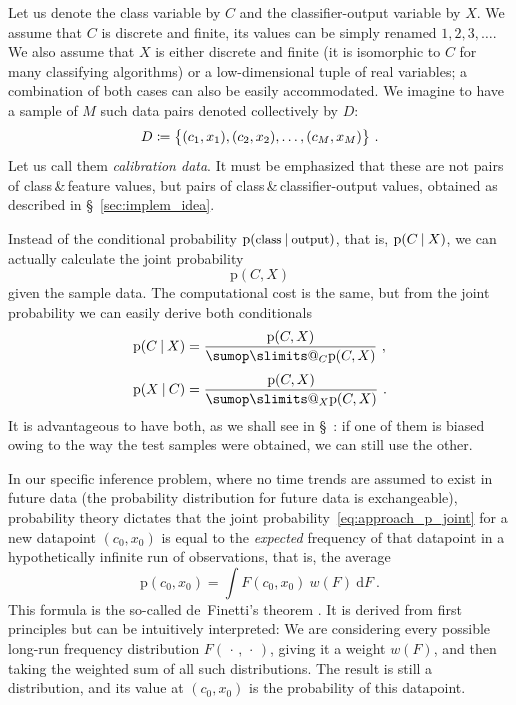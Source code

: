 \documentclass[\ifafour a4paper,12pt,\else a5paper,10pt,\fi%
onecolumn,oneside,article,%
british%
]{memoir}
\makeatletter
\theoremstyle{remark}
\theoremstyle{innote}
\def\sum{\DOTSI\sumop\slimits@}
\newcommand*{\amp}{\&}
\newcommand*{\wrench}{{\fontencoding{U}\fontfamily{fontawesomethree}\selectfont\symbol{114}}}
\newcommand*{\pencil}{{\fontencoding{U}\fontfamily{fontawesometwo}\selectfont\symbol{210}}}
\newcommand{\mynotew}[1]{{\footnotesize\color{notecolour}\wrench\ #1}}
\newcommand*{\di}{\mathrm{d}}%
\newcommand*{\defd}{\coloneqq}
\newcommand*{\dotv}{\mathord{\,\cdot\,}}%
\DeclarePairedDelimiter\set{\{}{\}} %
\newcommand*{\p}{\mathrm{p}}%
\renewcommand*{\|}[1][]{\nonscript\:#1\vert\nonscript\:\mathopen{}}
\newcommand*{\sect}{\S}%
\newcommand*{\chap}{ch.}%
\newcommand*{\wf}{w}
\newcommand*{\texts}[1]{\text{\small #1}}
\makeatother
\begin{document}
Let us denote the class variable by $C$ and the classifier-output variable by $X$. We assume that $C$ is discrete and finite, its values can be simply renamed $1,2,3,\dotsc$. We also assume that $X$ is either discrete and finite (it is isomorphic to $C$ for many classifying algorithms) or a low-dimensional tuple of real variables; a combination of both cases can also be easily accommodated. We imagine to have a sample of $M$ such data pairs denoted collectively by $D$:
\begin{equation}
  \label{eq:sample_data_notation}
  D \defd \set[\big]{(c_{1}, x_{1}), (c_{2}, x_{2}), \dotsc, (c_{M}, x_{M}) } \ .
\end{equation}
Let us call them \emph{calibration data}. It must be emphasized that these are not pairs of class\,\amp\,feature values, but pairs of class\,\amp\,classifier-output values, obtained as described in \sect~\ref{sec:implem_idea}.

Instead of the conditional probability $\p(\texts{class} \| \texts{output})$, that is, $\p(C \| X)$,  we can actually calculate the joint probability
\begin{equation}
  \label{eq:approach_p_joint}
  \p(C, X)
\end{equation}
given the sample data. The computational cost is the same, but from the joint probability we can easily derive both conditionals
\begin{align}
  \label{eq:approach_p_conditional_direct}
  \p(C \| X) &= \frac{\p(C, X)}{ \sum_{C} \p(C, X) } \ ,
  \\[\jot]
  \label{eq:approach_p_conditional_inverse}
  \p(X \| C) &= \frac{\p(C, X)}{ \sum_{X} \p(C, X) } \ .
\end{align}
It is advantageous to have both, as we shall see in \sect\mynotew{\pencil}: if one of them is biased owing to the way the test samples were obtained, we can still use the other.

In our specific inference problem, where no time trends are assumed to exist in future data (the probability distribution for future data is exchangeable), probability theory dictates that the joint probability~\eqref{eq:approach_p_joint} for a new datapoint $(c_{0}, x_{0})$ is equal to the \emph{expected} frequency of that datapoint  in a hypothetically infinite run of observations, that is, the average
\begin{equation}
  \label{eq:prob_is_expe_freq}
  \p(c_{0}, x_{0}) = \int\! F(c_{0}, x_{0})\ \wf(F)\ \di F \ .
\end{equation}
This formula is the so-called de~Finetti's theorem \autocites[\chap~4]{bernardoetal1994_r2000}{dawid2013,definetti1929,definetti1937}. It is derived from first principles but can be intuitively interpreted: We are considering every possible long-run frequency distribution $F(\dotv, \dotv)$, giving it a weight $\wf(F)$, and then taking the weighted sum of all such distributions. The result is still a distribution, and its value at $(c_{0}, x_{0})$ is the probability of this datapoint.
\end{document}
